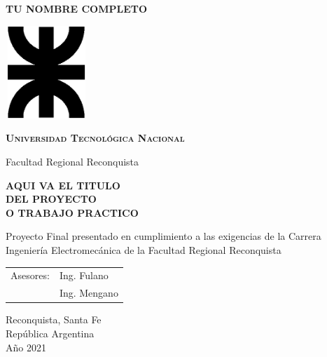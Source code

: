 \thispagestyle{empty}

\begin{center}
	
	{\huge{\textsc{\textbf{TU NOMBRE COMPLETO}}}}
	
	\vspace{2cm}
	
	\includegraphics[width=31mm,height=35mm]{imagenes/LogoUTN_nvgsb.eps}
	
	\vspace{2cm}
	
	{\Large{\textsc{\textbf{Universidad Tecnológica Nacional}}}}
	
	{\Large{Facultad Regional Reconquista}}
	
	\vspace{2cm}
	
	{\Large{\textsc{\textbf{AQUI VA EL TITULO \\ DEL PROYECTO  \\ O TRABAJO PRACTICO}}}}
	
	\vspace{2cm}
	
	{\large{Proyecto Final presentado en cumplimiento a las exigencias de la Carrera Ingeniería Electromecánica de la Facultad Regional Reconquista}}
\end{center}

\vspace{1.5cm}

{\large{
		\begin{tabular}{@{}p{}p{}@{}}
			Asesores: & Ing. Fulano \\ & Ing. Mengano
\end{tabular}}}


\vfill

\begin{center}\begin{large}
		Reconquista, Santa Fe\\República Argentina\\Año 2021
\end{large}\end{center}
